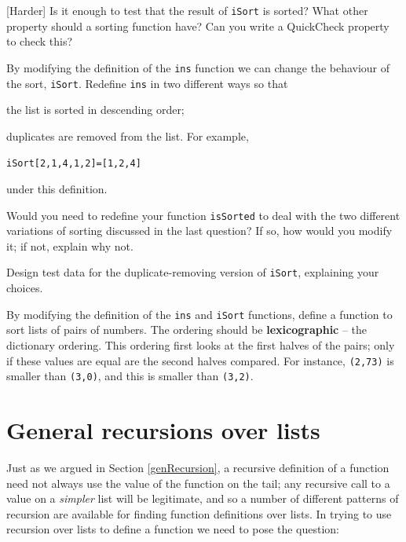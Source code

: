 \begin{exercises}
\item {[Harder]}
Is it enough to test that the result of \texttt{iSort} is sorted? What other property should a sorting function have? Can you write a QuickCheck property to check this?


\item
By modifying the definition of the \texttt{ins} function we can change the
behaviour of the sort, \texttt{iSort}. Redefine \texttt{ins} in two different ways
so that 
\begin{titemize}
\item the list is sorted in descending order;
\item duplicates are removed from the list. For example,
\begin{alltt}
iSort [2,1,4,1,2] = [1,2,4]
\end{alltt}
under this definition. 
\end{titemize}

\item
Would you need to redefine your function \texttt{isSorted} to deal with the two different variations of sorting discussed in the last question? If so, how would you modify it; if not, explain why not.

\item
Design test data for the duplicate-removing version of
\texttt{iSort}, explaining your choices.

\item
By modifying the definition of the \texttt{ins} and \texttt{iSort} functions, 
define a function to sort lists of pairs of numbers. The ordering should
be \textbf{lexicographic} -- the dictionary ordering. 
 This ordering first
looks at the first halves of the pairs; only if these values are equal
are the second halves compared. For instance, \texttt{(2,73)}
is smaller than \texttt{(3,0)}, and this is smaller than \texttt{(3,2)}.
\end{exercises}

\section{General recursions over lists}

Just as we argued in Section \ref{genRecursion}, a recursive definition
of a function need not always use the value of the function
on the tail;  any recursive call to
a value on a {\em simpler\/} list will be legitimate, and so a number of
different patterns of recursion are available for finding function
definitions over lists.
In trying to use recursion over lists to define a function we need to pose the
question:

